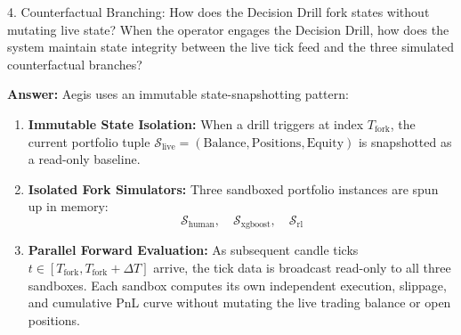 \documentclass[11pt,a4paper]{article}
\begin{document}
\begin{questionbox}{4. Counterfactual Branching: How does the Decision Drill fork states without mutating live state?}
When the operator engages the Decision Drill, how does the system maintain state integrity between the live tick feed and the three simulated counterfactual branches?
\end{questionbox}
\begin{answerbox}
\textbf{Answer:} Aegis uses an immutable state-snapshotting pattern:
\begin{enumerate}[leftmargin=1.5em]
  \item \textbf{Immutable State Isolation:} When a drill triggers at index $T_{\text{fork}}$, the current portfolio tuple $\mathcal{S}_{\text{live}} = (\text{Balance}, \text{Positions}, \text{Equity})$ is snapshotted as a read-only baseline.
  \item \textbf{Isolated Fork Simulators:} Three sandboxed portfolio instances are spun up in memory:
  $$\mathcal{S}_{\text{human}}, \quad \mathcal{S}_{\text{xgboost}}, \quad \mathcal{S}_{\text{rl}}$$
  \item \textbf{Parallel Forward Evaluation:} As subsequent candle ticks $t \in [T_{\text{fork}}, T_{\text{fork}} + \Delta T]$ arrive, the tick data is broadcast read-only to all three sandboxes. Each sandbox computes its own independent execution, slippage, and cumulative PnL curve without mutating the live trading balance or open positions.
\end{enumerate}
\end{answerbox}

\vspace{0.4em}
\end{document}
